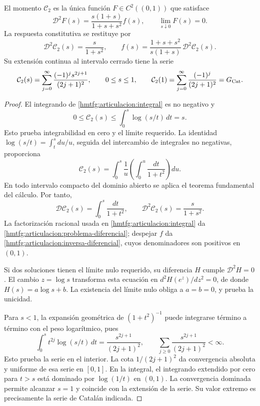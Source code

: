 \begin{proposition}
\label{hmtfg:articulacion:restitucion-catalan}
El momento \(\mathcal C_2\) es la única función
\(F\in C^2((0,1))\) que satisface
\begin{equation}
 \mathcal D^2F(s)=\frac{s(1+s)}{1+s+s^2}f(s),\qquad
 \lim_{s\downarrow0}F(s)=0.
 \label{hmtfg:articulacion:problema-diferencial}
\end{equation}
La respuesta constitutiva se restituye por
\begin{equation}
 \mathcal D^2\mathcal C_2(s)=\frac{s}{1+s^2},\qquad
 f(s)=\frac{1+s+s^2}{s(1+s)}\,
          \mathcal D^2\mathcal C_2(s).
 \label{hmtfg:articulacion:inversa-diferencial}
\end{equation}
Su extensión continua al intervalo cerrado tiene la serie
\begin{equation}
 \mathcal C_2(s)=\sum_{j=0}^{\infty}
       \frac{(-1)^j s^{2j+1}}{(2j+1)^2},\qquad 0\le s\le1,
 \qquad
 \mathcal C_2(1)=\sum_{j=0}^{\infty}\frac{(-1)^j}{(2j+1)^2}
 =G_{\rm Cat}.
 \label{hmtfg:articulacion:serie-catalan}
\end{equation}
\end{proposition}
\begin{proof}
El integrando de \eqref{hmtfg:articulacion:integral} es no negativo
y
\[
 0\le\mathcal C_2(s)\le\int_0^s\log(s/t)\,dt=s.
\]
Esto prueba integrabilidad en cero y el límite requerido.
La identidad \(\log(s/t)=\int_t^s du/u\), seguida del
intercambio de integrales no negativas, proporciona
\[
 \mathcal C_2(s)
 =\int_0^s\frac1u\left(\int_0^u\frac{dt}{1+t^2}\right)du.
\]
En todo intervalo compacto del dominio abierto se aplica el
teorema fundamental del cálculo. Por tanto,
\[
 \mathcal D\mathcal C_2(s)=\int_0^s\frac{dt}{1+t^2},
 \qquad
 \mathcal D^2\mathcal C_2(s)=\frac{s}{1+s^2}.
\]
La factorización racional usada en
\eqref{hmtfg:articulacion:integral} da
\eqref{hmtfg:articulacion:problema-diferencial}; despejar \(f\)
da \eqref{hmtfg:articulacion:inversa-diferencial}, cuyos
denominadores son positivos en \((0,1)\).

Si dos soluciones tienen el límite nulo requerido, su diferencia
\(H\) cumple \(\mathcal D^2H=0\). El cambio \(z=\log s\)
transforma esta ecuación en \(d^2H(e^z)/dz^2=0\), de donde
\(H(s)=a\log s+b\). La existencia del límite nulo obliga a
\(a=b=0\), y prueba la unicidad.

Para \(s<1\), la expansión geométrica de \((1+t^2)^{-1}\)
puede integrarse término a término con el peso logarítmico, pues
\[
 \int_0^s t^{2j}\log(s/t)\,dt
 =\frac{s^{2j+1}}{(2j+1)^2},\qquad
 \sum_{j\ge0}\frac{s^{2j+1}}{(2j+1)^2}<\infty.
\]
Esto prueba la serie en el interior. La cota
\(1/(2j+1)^2\) da convergencia absoluta y uniforme de esa
serie en \([0,1]\). En la integral, el integrando extendido
por cero para \(t>s\) está dominado por \(\log(1/t)\)
en \((0,1)\). La convergencia dominada permite alcanzar
\(s=1\) y coincide con la extensión de la serie. Su valor
extremo es precisamente la serie de Catalán indicada.
\end{proof}

